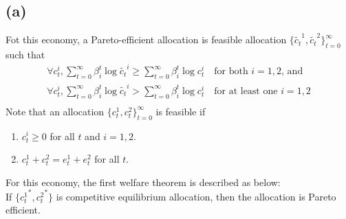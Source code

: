 \documentclass[a4paper]{article}
\begin{document}
\subsection*{(a)}
Fot this economy, a Pareto-efficient allocation is feasible allocation $\{\tilde{c_t}^1, \tilde{c_t}^2\}_{t=0}^\infty$ such that
\begin{gather*}
    \forall c_t^i, \sum_{t=0}^{\infty} \beta_i^t \log \tilde{c_t}^i \geq \sum_{t=0}^{\infty} \beta_i^t \log c_t^i \quad \text{for both } i=1,2 \text{, and}\\
    \forall c_t^i, \sum_{t=0}^{\infty} \beta_i^t \log \tilde{c_t}^i > \sum_{t=0}^{\infty} \beta_i^t \log c_t^i \quad \text{for at least one } i=1,2 \\
\end{gather*}
Note that an allocation $\{c_t^1, c_t^2\}_{t=0}^\infty$ is feasible if
\begin{enumerate}
    \item $c_t^i \geq 0$ for all $t$ and $i=1,2$.
    \item $c_t^1 + c_t^2 = e_t^1 + e_t^2$ for all $t$.
\end{enumerate}
For this economy, the first welfare theorem is described as below:\\
\hspace{5mm} If $\{{c_t^1}^*, {c_t^2}^*\}$ is competitive equilibrium allocation, then the allocation is Pareto efficient.
\end{document}
